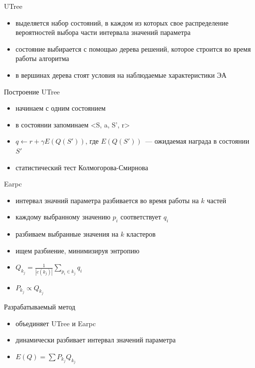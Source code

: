 \documentclass[hyperref=unicode,graphics=pdflatex,13pt]{beamer}
\begin{document}
\begin{frame} {UTree}
  \begin{itemize}
    \item выделяется набор состояний, в каждом из которых свое распределение вероятностей выбора части интервала значений параметра
    \item состояние выбирается с помощью дерева решений, которое строится во время работы алгоритма
    \item в вершинах дерева стоят условия на наблюдаемые характеристики ЭА
  \end{itemize}
\end{frame}

\begin{frame}{Построение UTree}
    \begin{itemize}
        \item начинаем с одним состоянием
        \item в состоянии запоминаем <S, a, S', r>
        \item $q \gets r + \gamma E(Q(S'))$, где $E(Q(S'))$~--- ожидаемая награда в состоянии $S'$
        \item статистический тест Колмогорова-Смирнова
    \end{itemize}
\end{frame}


\begin{frame}{Earpc}
  \begin{itemize}
    \item интервал значний параметра разбивается во время работы на $k$ частей
    \item каждому выбранному значению $p_i$ соответствует $q_i$
    \item разбиваем выбранные значения на $k$ кластеров
    \item ищем разбиение, минимизируя энтропию
    \item $Q_{k_j} = \frac{1}{|c(k_j)|}\sum_{p_i \in k_j}{q_i}$
    \item $P_{k_j} \propto Q_{k_j}$
  \end{itemize}
\end{frame}


\begin{frame}{Разрабатываемый метод}
    \begin{itemize}
        \item объединяет UTree и Earpc
        \item динамически разбивает интервал значений параметра
        \item $E(Q) = \sum{P_{k_j}Q_{k_j}}$
    \end{itemize}
\end{frame}
\end{document}

